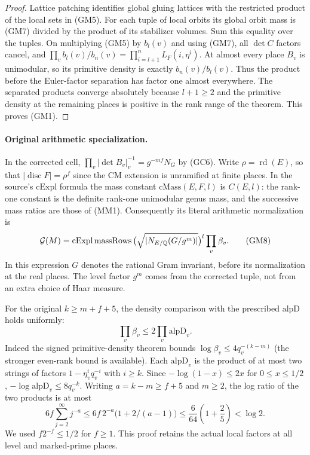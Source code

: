 \begin{proof}
Lattice patching identifies global gluing lattices with
the restricted product of the local sets in (GM5).
For each tuple of local orbits its global orbit mass
is (GM7) divided by the product of its stabilizer
volumes. Sum this equality over the tuples. On
multiplying (GM5) by \(b_l(v)\) and using (GM7), all
\(\det C\) factors cancel, and
\(\prod_v b_l(v)/b_n(v)=\prod_{i=l+1}^nL_F(i,\eta^i)\).
At almost every place \(B_v\) is unimodular, so its
primitive density is exactly \(b_n(v)/b_l(v)\).
Thus the product before the Euler-factor separation
has factor one almost everywhere. The separated
products converge absolutely because \(l+1\ge2\)
and the primitive density at the remaining places
is positive in the rank range of the theorem.
This proves (GM1).
\end{proof}

\paragraph{Original arithmetic specialization.}
In the corrected cell,
\(\prod_v|\det B_v|_v^{-1}=g^{-mf}N_G\)
by (GC6). Write \(\rho=\operatorname{rd}(E)\), so that
\(|\operatorname{disc}F|=\rho^f\) since the CM extension is
unramified at finite places. In the source's
\(\mathrm{cExpl}\) formula the mass constant
\(\mathrm{cMass}(E,F,l)\) is \(C(E,l)\): the rank-one
constant is the definite rank-one unimodular genus mass,
and the successive mass ratios are those of (MM1).
Consequently its literal arithmetic normalization is
\[
 {\cal G}(M)=
 \mathrm{cExpl}\,\mathrm{massRows}\,
     \bigl(\sqrt{|N_{E/\mathbb Q}(G/g^m)|}\bigr)^l
          \prod_v\beta_v .
 \tag{GM8}
\]
In this expression \(G\) denotes the rational Gram
invariant, before its normalization at the real places.
The level factor \(g^m\) comes from the corrected tuple,
not from an extra choice of Haar measure.

For the original \(k\ge m+f+5\), the density comparison
with the prescribed \(\mathrm{alpD}\) holds uniformly:
\[
 \prod_v\beta_v\le 2\prod_v\mathrm{alpD}_v.
 \tag{GM9}
\]
Indeed the signed primitive-density theorem bounds
\(\log\beta_v\le 4q_v^{-(k-m)}\) (the stronger even-rank
bound is available). Each \(\mathrm{alpD}_v\) is the
product of at most two strings of factors
\(1-\eta_v^i q_v^{-i}\) with \(i\ge k\). Since
\(-\log(1-x)\le2x\) for \(0\le x\le1/2\),
\(-\log\mathrm{alpD}_v\le8q_v^{-k}\).
Writing \(a=k-m\ge f+5\) and \(m\ge2\), the log ratio
of the two products is at most
\[
 6f\sum_{j=2}^{\infty} j^{-a}
 \le6f\,2^{-a}\bigl(1+2/(a-1)\bigr)
 \le \frac{6}{64}\left(1+\frac25\right)<\log 2.
\]
We used \(f2^{-f}\le1/2\) for \(f\ge1\).
This proof retains the actual local factors at all
level and marked-prime places.

